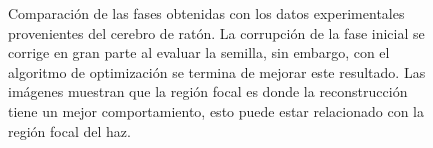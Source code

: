 \begin{figure}[ht!]
	\caption[Comparación de la fase recuperada con la optimización en datos experimentales]{Comparación de las fases obtenidas con los datos experimentales provenientes del cerebro de ratón. La corrupción de la fase inicial se corrige en gran parte al evaluar la semilla, sin embargo, con el algoritmo de optimización se termina de mejorar este resultado. Las imágenes muestran que la región focal es donde la reconstrucción tiene un mejor comportamiento, esto puede estar relacionado con la región focal del haz.}
	\label{fig:exp_phase}
\end{figure}


